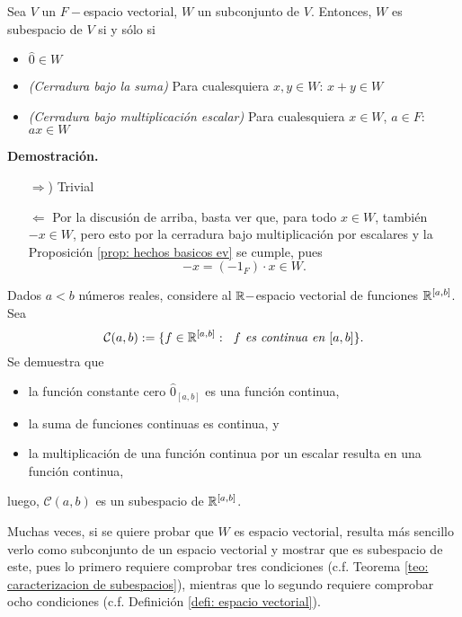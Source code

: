 \begin{teo}
	\label{teo: caracterizacion de subespacios}
	Sea $V$ un $F-$espacio vectorial, $W$ un subconjunto de $V$. 
	Entonces, $W$ es subespacio de $V$ si y sólo si 
	\begin{itemize}
		\item $\hat{0} \in W$
		\item \textit{(Cerradura bajo la suma)} Para cualesquiera $x, y \in W$: $x + y \in W$
		\item \textit{(Cerradura bajo multiplicación escalar)} Para cualesquiera 
		$x \in W$, $a \in F$: $ax \in W$
	\end{itemize}
\end{teo}
\textbf{Demostración.}
\begin{itemize}
	\item[$\Rightarrow$)] Trivial
	\item[$\Leftarrow$] Por la discusión de arriba, basta ver que, para todo
	$x \in W$, también $-x \in W$, pero esto por la cerradura bajo multiplicación 
	por escalares y la Proposición 
	\ref{prop: hechos basicos ev} se cumple, pues
	\[
	-x = (-1_{F}) \cdot x \in W.
	\]
\end{itemize}
\QEDB
\vspace{0.2cm}

\begin{ejem}
	Dados $a < b$ números reales, 
	considere al $\mathbb{R}-$espacio vectorial de funciones $\mathbb{R}^{[a, b]}$. 
	Sea
	\[
	\mathcal{C}(a, b) := \{ f \in \mathbb{R}^{[a, b]} : \hspace{0.2cm} f \textit{
	es continua en } [a, b] \}.
	\]
	Se demuestra que
	\begin{itemize}
		\item la función constante cero $\hat{0}_{[a, b]}$ es una función continua,
		\item la suma de funciones continuas es continua, y
		\item la multiplicación de una función continua por un escalar resulta en una
		función continua,
	\end{itemize}
	luego, $\mathcal{C}(a, b)$ es un subespacio de $\mathbb{R}^{[a, b]}$.
\end{ejem}

Muchas veces, si se quiere probar que $W$ es espacio vectorial, resulta más sencillo
verlo como subconjunto de un espacio vectorial y mostrar que es subespacio de este,
pues lo primero requiere comprobar tres condiciones 
(c.f. Teorema \ref{teo: caracterizacion de subespacios}), mientras que lo segundo 
requiere comprobar ocho condiciones 
(c.f. Definición \ref{defi: espacio vectorial}).

